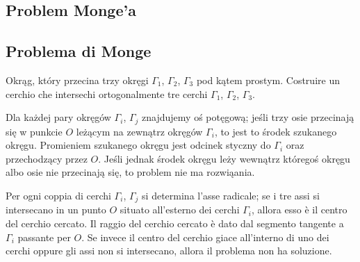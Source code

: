 %

\subsection{Problem Monge'a} %
\subsection{Problema di Monge} %

\begin{problem}
[Monge'a?] %
[di Monge?] %
    Okrąg, który przecina trzy okręgi $\Gamma_1$, $\Gamma_2$, $\Gamma_3$ pod kątem prostym. %
    Costruire un cerchio che intersechi ortogonalmente tre cerchi $\Gamma_1$, $\Gamma_2$, $\Gamma_3$. %
\end{problem}

Dla każdej pary okręgów $\Gamma_i$, $\Gamma_j$ znajdujemy oś potęgową; jeśli trzy osie przecinają się w punkcie $O$ leżącym na zewnątrz okręgów $\Gamma_i$, to jest to środek szukanego okręgu. %
Promieniem szukanego okręgu jest odcinek styczny do $\Gamma_i$ oraz przechodzący przez $O$. %
Jeśli jednak środek okręgu leży wewnątrz któregoś okręgu albo osie nie przecinają się, to problem nie ma rozwiąania. %

Per ogni coppia di cerchi $\Gamma_i$, $\Gamma_j$ si determina l'asse radicale; se i tre assi si intersecano in un punto $O$ situato all'esterno dei cerchi $\Gamma_i$, allora esso è il centro del cerchio cercato. %
Il raggio del cerchio cercato è dato dal segmento tangente a $\Gamma_i$ passante per $O$. %
Se invece il centro del cerchio giace all'interno di uno dei cerchi oppure gli assi non si intersecano, allora il problema non ha soluzione. %

%